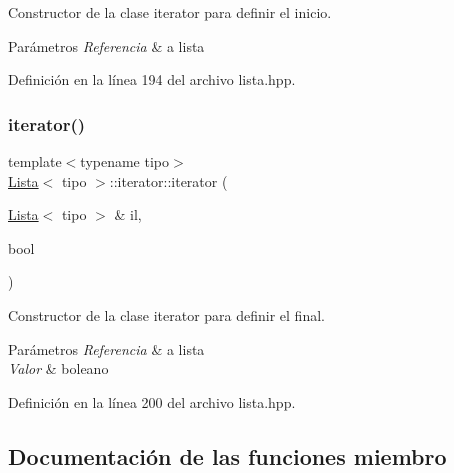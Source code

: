 Constructor de la clase iterator para definir el inicio. 


\begin{DoxyParams}{Parámetros}
{\em Referencia} & a lista \\
\hline
\end{DoxyParams}


Definición en la línea 194 del archivo lista.\+hpp.

\mbox{\label{classLista_1_1iterator_ad96ff61e26fb131406d0b320b36e9516}} 
\subsubsection{\texorpdfstring{iterator()}{iterator()}\hspace{0.1cm}{\footnotesize\ttfamily [2/2]}}
{\footnotesize\ttfamily template$<$typename tipo$>$ \\
\hyperlink{classLista}{Lista}$<$ tipo $>$\+::iterator\+::iterator (\begin{DoxyParamCaption}\item[{\hyperlink{classLista}{Lista}$<$ tipo $>$ \&}]{il,  }\item[{bool}]{ }\end{DoxyParamCaption})\hspace{0.3cm}{\ttfamily [inline]}}



Constructor de la clase iterator para definir el final. 


\begin{DoxyParams}{Parámetros}
{\em Referencia} & a lista \\
\hline
{\em Valor} & boleano \\
\hline
\end{DoxyParams}


Definición en la línea 200 del archivo lista.\+hpp.



\subsection{Documentación de las funciones miembro}
\mbox{\label{classLista_1_1iterator_a6e73de7c83716c9bd99bd68b89214d81}} 
